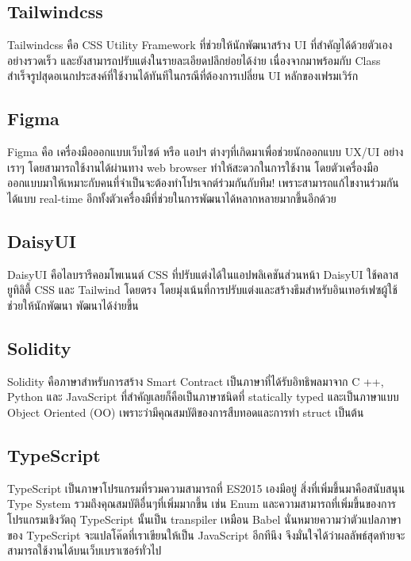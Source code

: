 \documentclass[12pt,oneside,openright,a4paper]{cpe-thai-project}
\begin{document}
\subsection{Tailwindcss \cite{tailwind}}
\tab Tailwindcss คือ CSS Utility Framework ที่ช่วยให้นักพัฒนาสร้าง UI ที่สำคัญได้ด้วยตัวเองอย่างรวดเร็ว และยังสามารถปรับแต่งในรายละเอียดปลีกย่อยได้ง่าย เนื่องจากมาพร้อมกับ Class สำเร็จรูปสุดอเนกประสงค์ที่ใช้งานได้ทันทีในกรณีที่ต้องการเปลี่ยน UI หลักของเฟรมเวิร์ก

\subsection{Figma \cite{figma}}
\tab Figma คือ เครื่องมือออกแบบเว็บไซต์ หรือ แอปฯ ต่างๆที่เกิดมาเพื่อช่วยนักออกแบบ UX/UI อย่างเราๆ โดยสามารถใช้งานได้ผ่านทาง web browser ทำให้สะดวกในการใช้งาน โดยตัวเครื่องมือออกแบบมาให้เหมาะกับคนที่จำเป็นจะต้องทำโปรเจกต์ร่วมกันกับทีม! เพราะสามารถแก้ไขงานร่วมกันได้แบบ real-time อีกทั้งตัวเครื่องมืที่ช่วยในการพัฒนาได้หลากหลายมากขึ้นอีกด้วย 

\subsection{DaisyUI \cite{daisyUI}}
\tab DaisyUI คือไลบรารีคอมโพเนนต์ CSS ที่ปรับแต่งได้ในแอปพลิเคชันส่วนหน้า DaisyUI ใช้คลาสยูทิลิตี้ CSS และ Tailwind โดยตรง โดยมุ่งเน้นที่การปรับแต่งและสร้างธีมสำหรับอินเทอร์เฟซผู้ใช้ ช่วยให้นักพัฒนา พัฒนาได้ง่ายขึ้น

\subsection{Solidity \cite{solidity}}
\tab Solidity คือภาษาสำหรับการสร้าง Smart Contract เป็นภาษาที่ได้รับอิทธิพลมาจาก C ++, Python และ JavaScript ที่สำคัญเลยก็คือเป็นภาษาชนิดที่ statically typed และเป็นภาษาแบบ Object Oriented (OO) เพราะว่ามีคุณสมบัติของการสืบทอดและการทำ struct เป็นต้น

\subsection{TypeScript \cite{typescript}}
\tab TypeScript เป็นภาษาโปรแกรมที่รวมความสามารถที่ ES2015 เองมีอยู่ สิ่งที่เพิ่มขึ้นมาคือสนับสนุน Type System รวมถึงคุณสมบัติอื่นๆที่เพิ่มมากขึ้น เช่น Enum และความสามารถที่เพิ่มขึ้นของการโปรแกรมเชิงวัตถุ TypeScript นั้นเป็น transpiler เหมือน Babel นั่นหมายความว่าตัวแปลภาษาของ TypeScript จะแปลโค๊ดที่เราเขียนให้เป็น JavaScript อีกทีนึง จึงมั่นใจได้ว่าผลลัพธ์สุดท้ายจะสามารถใช้งานได้บนเว็บเบราเซอร์ทั่วไป
\end{document}
